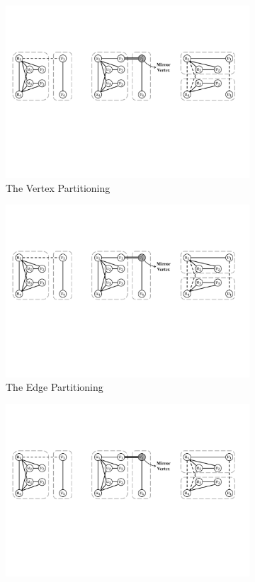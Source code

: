 \begin{figure}[h]
    \centering
        \begin{subfigure}{0.275\linewidth}
            \centering
            \includegraphics[width=0.8\linewidth]{figures/challenge_partition_a.pdf}
            \caption{The Vertex Partitioning}
            \label{fig:challenge_partition_vertex}
        \end{subfigure}
    \hspace{-1em}
        \begin{subfigure}{0.35\linewidth}
            \centering
            \includegraphics[width=1.0\linewidth]{figures/challenge_partition_b.pdf}
            \caption{The Edge Partitioning}
            \label{fig:challenge_partition_edge}
        \end{subfigure}
    \hspace{-1em}
        \begin{subfigure}{0.3\linewidth}
            \centering
            \includegraphics[width=0.65\linewidth]{figures/challenge_partition_c.pdf}

\end{subfigure}
\end{figure}

